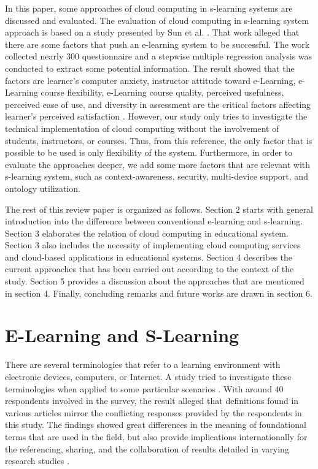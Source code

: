 \documentclass[journal]{vgtc}
\begin{document}
In this paper, some approaches of cloud computing in s-learning systems are discussed and evaluated. The evaluation of cloud computing in s-learning system approach is based on a study presented by Sun et al. \cite{Sun2008}. That work alleged that there are some factors that push an e-learning system to be successful. The work collected nearly 300 questionnaire and a stepwise multiple regression analysis was conducted to extract some potential information. The result showed that the factors are learner's computer anxiety, instructor attitude toward e-Learning, e-Learning course flexibility, e-Learning course quality, perceived usefulness, perceived ease of use, and diversity in assessment are the critical factors affecting learner's perceived satisfaction \cite{Sun2008}. However, our study only tries to investigate the technical implementation of cloud computing without the involvement of students, instructors, or courses. Thus, from this reference, the only factor that is possible to be used is only flexibility of the system. Furthermore, in order to evaluate the approaches deeper, we add some more factors that are relevant with s-learning system, such as context-awareness, security, multi-device support, and ontology utilization.

The rest of this review paper is organized as follows. Section 2 starts with general introduction into the difference between conventional e-learning and s-learning. Section 3 elaborates the relation of cloud computing in educational system. Section 3 also includes the necessity of implementing cloud computing services and cloud-based applications in educational systems. Section 4 describes the current approaches that has been carried out according to the context of the study. Section 5 provides a discussion about the approaches that are mentioned in section 4. Finally, concluding remarks and future works are drawn in section 6.

\section{E-Learning and S-Learning}
There are several terminologies that refer to a learning environment with electronic devices, computers, or Internet. A study tried to investigate these terminologies when applied to some particular scenarios \cite{Moore2011}. With around 40 respondents involved in the survey, the result alleged that definitions found in various articles mirror the conflicting responses provided by the respondents in this study. The findings showed great differences in the meaning of foundational terms that are used in the field, but also provide implications internationally for the referencing, sharing, and the collaboration of results detailed in varying research studies \cite{Moore2011}.
\end{document}
